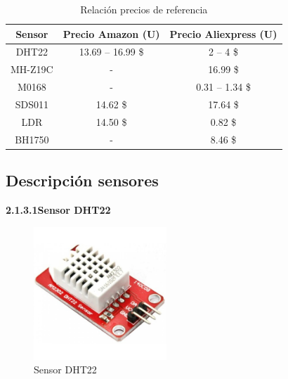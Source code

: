 \begin{table}[H]
    \centering
    \caption{Relación precios de referencia}
    \begin{tabular}{|c|c|c|}
    \hline
    \textbf{Sensor} & \textbf{Precio Amazon (U)} & \textbf{Precio Aliexpress (U)} \\ \hline
    DHT22           & 13.69 – 16.99 \$           & 2 – 4 \$                       \\ \hline
    MH-Z19C         & -                          & 16.99 \$                       \\ \hline
    M0168           & -                          & 0.31 – 1.34 \$                 \\ \hline
    SDS011          & 14.62 \$                   & 17.64 \$                       \\ \hline
    LDR             & 14.50 \$                   & 0.82 \$                        \\ \hline
    BH1750          & -                          & 8.46 \$                        \\ \hline
    \end{tabular}
    \label{tab: precios_referencia}
\end{table}

\subsection{Descripción sensores} \label{subsec: descripcion_sensores}

        \textbf{2.1.3.1\hspace{5mm}Sensor DHT22}

  \begin{figure}[H]
      \centering
      \includegraphics[width=5cm, height=5cm]{imagenes/dht22.jpg}
      \caption{Sensor DHT22}
      \label{imag:dht22}
   \end{figure}
   

